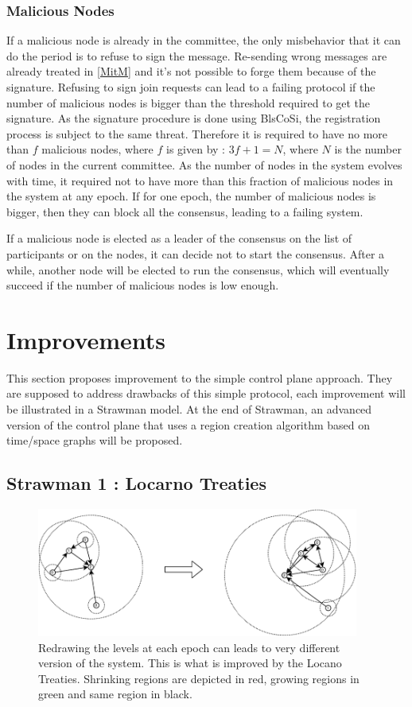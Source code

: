 \documentclass[a4paper,11pt,oneside]{report}
\begin{document}
\subsection{Malicious Nodes}
If a malicious node is already in the committee, the only misbehavior that it
can do the period is to refuse to sign the message. Re-sending wrong messages
are already treated in \ref{MitM} and it's not possible to forge them because
of the signature. Refusing to sign join requests can lead to a failing protocol
if the number of malicious nodes is bigger than the threshold required to get
the signature. As the signature procedure is done using BlsCoSi, the
registration process is subject to the same threat. Therefore it is required to
have no more than $f$ malicious nodes, where $f$ is given by : $3f + 1 = N$,
where $N$ is the number of nodes in the current committee. As the number of
nodes in the system evolves with time, it required not to have more than this
fraction of malicious nodes in the system at any epoch. If for one epoch, the
number of malicious nodes is bigger, then they can block all the consensus,
leading to a failing system. 

If a malicious node is elected as a leader of the consensus on the list of
participants or on the nodes, it can decide not to start the consensus. After a
while, another node will be elected to run the consensus, which will eventually
succeed if the number of malicious nodes is low enough.

\chapter{Improvements}
This section proposes improvement to the simple control plane approach. They
are supposed to address drawbacks of this simple protocol, each improvement
will be illustrated in a Strawman model. At the end of Strawman, an advanced
version of the control plane that uses a region creation algorithm based on
time/space graphs will be proposed. 

\section{Strawman 1 : Locarno Treaties} \label{Locarno}

\begin{figure}[!h] 
\centering
\includegraphics[width=300pt]{figures/LocarnoTreaties-Redrawing}
\caption{Redrawing the levels at each epoch can leads to very different version
    of the system. This is what is improved by the Locano Treaties. Shrinking
    regions are depicted in red, growing regions in green and same region in
    black.} \label{fig:LocarnoTreaties-Redrawing}
\end{figure}
\end{document}
